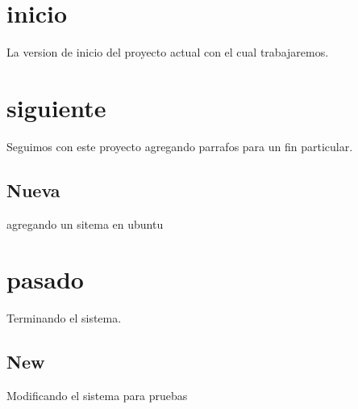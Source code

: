 \documentclass[a4paper]{article}
\begin{document}
    \section{inicio}
    La version de inicio del proyecto actual con el cual trabajaremos.

    \section{siguiente}
    Seguimos con este proyecto agregando parrafos para un fin particular.
        \subsection{Nueva}
        agregando un sitema en ubuntu

    \section{pasado}
    Terminando el sistema.
    \subsection{New}
    Modificando el sistema para pruebas
    
\end{document}
